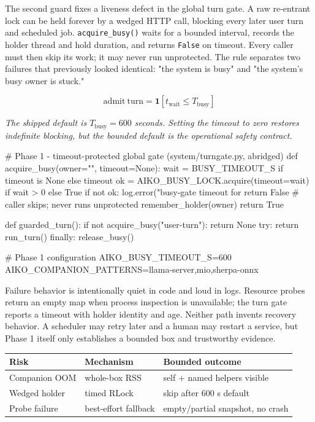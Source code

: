 \documentclass[11pt]{article}
\begin{document}
The second guard fixes a liveness defect in the global turn gate. A raw re-entrant lock can be held forever by a wedged HTTP call, blocking every later user turn and scheduled job. \texttt{acquire\_busy()} waits for a bounded interval, records the holder thread and hold duration, and returns \texttt{False} on timeout. Every caller must then skip its work; it may never run unprotected. The rule separates two failures that previously looked identical: "the system is busy" and "the system's busy owner is stuck."

\begin{equation}
\mathrm{admit\ turn}=\mathbf{1}[t_{\mathrm{wait}}\le T_{\mathrm{busy}}]
\tag{1}
\end{equation}

\noindent\emph{The shipped default is \(T_{\mathrm{busy}}=600\) seconds. Setting the timeout to zero restores indefinite blocking, but the bounded default is the operational safety contract.}

\begin{CodeBlock}
# Phase 1 - timeout-protected global gate (system/turngate.py, abridged)
def acquire_busy(owner="", timeout=None):
    wait = BUSY_TIMEOUT_S if timeout is None else timeout
    ok = AIKO_BUSY_LOCK.acquire(timeout=wait) if wait > 0 else True
    if not ok:
        log.error("busy-gate timeout for %
        return False                   # caller skips; never runs unprotected
    remember_holder(owner)
    return True

def guarded_turn():
    if not acquire_busy("user-turn"):
        return None
    try:
        return run_turn()
    finally:
        release_busy()
\end{CodeBlock}

\begin{CodeBlock}
# Phase 1 configuration
AIKO_BUSY_TIMEOUT_S=600
AIKO_COMPANION_PATTERNS=llama-server,mio,sherpa-onnx
\end{CodeBlock}

Failure behavior is intentionally quiet in code and loud in logs. Resource probes return an empty map when process inspection is unavailable; the turn gate reports a timeout with holder identity and age. Neither path invents recovery behavior. A scheduler may retry later and a human may restart a service, but Phase 1 itself only establishes a bounded box and trustworthy evidence.

{\small
{}
\begin{longtable}{@{}>{\raggedright\arraybackslash}p{} >{\raggedright\arraybackslash}p{} >{\raggedright\arraybackslash}p{}@{}}
\toprule
\textbf{Risk} & \textbf{Mechanism} & \textbf{Bounded outcome} \\
\midrule
Companion OOM & whole-box RSS & self + named helpers visible \\
Wedged holder & timed RLock & skip after 600 s default \\
Probe failure & best-effort fallback & empty/partial snapshot, no crash \\
\bottomrule
\end{longtable}
}
\end{document}
